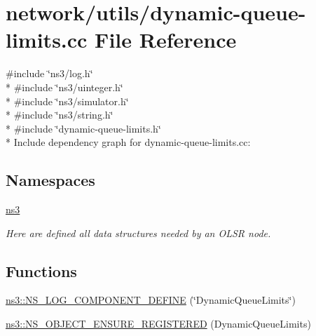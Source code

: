 \hypertarget{dynamic-queue-limits_8cc}{}\section{network/utils/dynamic-\/queue-\/limits.cc File Reference}
\label{dynamic-queue-limits_8cc}
{\ttfamily \#include \char`\"{}ns3/log.\+h\char`\"{}}\\*
{\ttfamily \#include \char`\"{}ns3/uinteger.\+h\char`\"{}}\\*
{\ttfamily \#include \char`\"{}ns3/simulator.\+h\char`\"{}}\\*
{\ttfamily \#include \char`\"{}ns3/string.\+h\char`\"{}}\\*
{\ttfamily \#include \char`\"{}dynamic-\/queue-\/limits.\+h\char`\"{}}\\*
Include dependency graph for dynamic-\/queue-\/limits.cc\+:
\subsection*{Namespaces}
\begin{DoxyCompactItemize}
\item 
 \hyperlink{namespacens3}{ns3}
\begin{DoxyCompactList}\small\item\em Here are defined all data structures needed by an O\+L\+SR node. \end{DoxyCompactList}\end{DoxyCompactItemize}
\subsection*{Functions}
\begin{DoxyCompactItemize}
\item 
\hyperlink{namespacens3_a28ab423795b8d0a675a91a4c2e1b5250}{ns3\+::\+N\+S\+\_\+\+L\+O\+G\+\_\+\+C\+O\+M\+P\+O\+N\+E\+N\+T\+\_\+\+D\+E\+F\+I\+NE} (\char`\"{}Dynamic\+Queue\+Limits\char`\"{})
\item 
\hyperlink{namespacens3_a9175af72ad92242ba62035203f95ce53}{ns3\+::\+N\+S\+\_\+\+O\+B\+J\+E\+C\+T\+\_\+\+E\+N\+S\+U\+R\+E\+\_\+\+R\+E\+G\+I\+S\+T\+E\+R\+ED} (Dynamic\+Queue\+Limits)
\end{DoxyCompactItemize}
